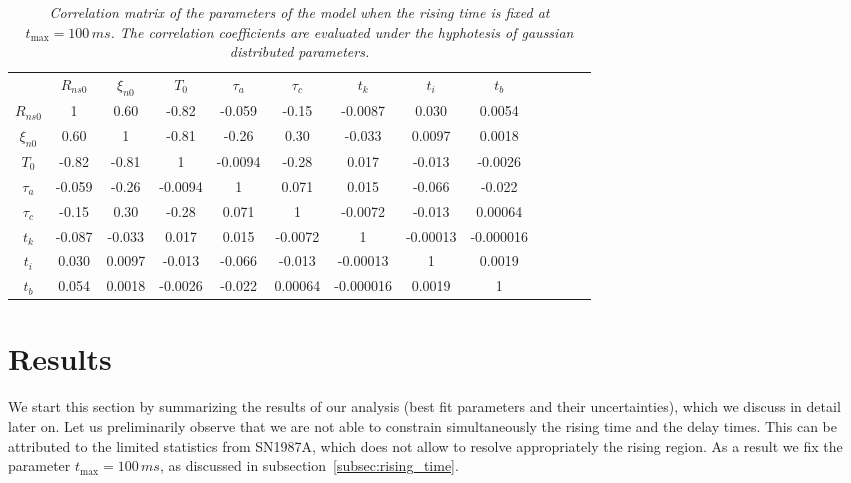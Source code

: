 \documentclass[a4paper,11pt]{article}
\begin{document}
\begin{table}[t!]
    \centering
    \begin{tabular}{ccccccccccccc}
    \toprule
   &$R_{ns0}$&$\xi_{n0}$&$T_0$&$\tau_a$&$\tau_c$&$t_k$&$t_i$&$t_b$ \\
   $R_{ns0}$&1&0.60&-0.82&-0.059&-0.15&-0.0087&0.030&0.0054\\
   $\xi_{n0}$&0.60&1&-0.81&-0.26&0.30&-0.033&0.0097&0.0018\\
   $T_0$&-0.82&-0.81&1&-0.0094&-0.28&0.017&-0.013&-0.0026 \\
   $\tau_a$&-0.059&-0.26&-0.0094&1&0.071&0.015&-0.066&-0.022\\
   $\tau_c$&-0.15&0.30&-0.28&0.071&1&-0.0072&-0.013&0.00064\\
   $t_k$&-0.087&-0.033&0.017&0.015&-0.0072&1&-0.00013&-0.000016\\
   $t_i$&0.030&0.0097&-0.013&-0.066&-0.013&-0.00013&1&0.0019\\
   $t_b$&0.054&0.0018&-0.0026&-0.022&0.00064&-0.000016&0.0019&1\\
   \bottomrule
\end{tabular}
\caption{\emph{Correlation matrix of the parameters of the model when the rising time is fixed at $t_{\text{max}}=100\,\unit{ms}$. The correlation coefficients are evaluated under the hyphotesis of gaussian distributed parameters.}}
\label{tab:correlation_matrix}
\end{table}


\section{Results}
\label{results}

We start this section by summarizing  the results of our analysis (best fit parameters and their uncertainties), which we  discuss in detail later on. Let us preliminarily observe  that
we are not able to constrain simultaneously the rising time and the delay times. 
This can be attributed to the 
limited statistics from SN1987A, which does not allow to resolve appropriately the rising region. As a result  we fix the parameter  $t_{\text{max}}=100\,\unit{ms}$, as discussed in subsection~\ref{subsec:rising_time}. 
\end{document}
